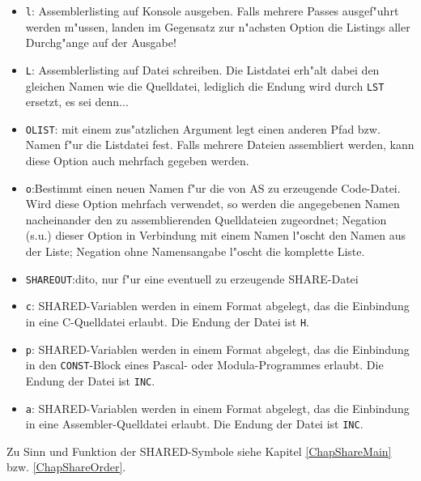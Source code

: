\documentclass[12pt,a4paper,twoside]{report}
\newcommand{\tty}[1]{{\tt #1}}
\begin{document}
\begin{itemize}
\item{\tty{l}: Assemblerlisting auf Konsole ausgeben.  Falls mehrere
      Passes ausgef"uhrt werden m"ussen, landen im Gegensatz zur
      n"achsten Option die Listings aller Durchg"ange auf der Ausgabe!}
\item{\tty{L}: Assemblerlisting auf Datei schreiben.  Die Listdatei erh"alt
      dabei den gleichen Namen wie die Quelldatei, lediglich die Endung
      wird durch \tty{LST} ersetzt, es sei denn...}
\item{\tty{OLIST}: mit einem zus"atzlichen Argument legt einen anderen
      Pfad bzw. Namen f"ur die Listdatei fest.  Falls mehrere Dateien
      assembliert werden, kann diese Option auch mehrfach gegeben werden.}
\item{\tty{o}:Bestimmt einen neuen Namen f"ur die von AS zu erzeugende
      Code-Datei.  Wird diese Option mehrfach verwendet, so werden
      die angegebenen Namen nacheinander den zu assemblierenden
      Quelldateien zugeordnet; Negation (s.u.) dieser Option in
      Verbindung mit einem Namen l"oscht den Namen aus der Liste;
      Negation ohne Namensangabe l"oscht die komplette Liste.}
\item{\tty{SHAREOUT}:dito, nur f"ur eine eventuell zu erzeugende 
      SHARE-Datei}
\item{\tty{c}: SHARED-Variablen werden in einem Format abgelegt, das die
      Einbindung in eine C-Quelldatei erlaubt.  Die Endung der Datei
      ist \tty{H}.}
\item{\tty{p}: SHARED-Variablen werden in einem Format abgelegt, das die
      Einbindung in den \tty{CONST}-Block eines Pascal- oder Modula-Programmes
      erlaubt.  Die Endung der Datei ist \tty{INC}.}
\item{\tty{a}: SHARED-Variablen werden in einem Format abgelegt, das die
      Einbindung in eine Assembler-Quelldatei erlaubt.  Die Endung
      der Datei ist \tty{INC}.}
\end{itemize}
Zu Sinn und Funktion der SHARED-Symbole siehe Kapitel \ref{ChapShareMain}
bzw. \ref{ChapShareOrder}.
\end{document}
